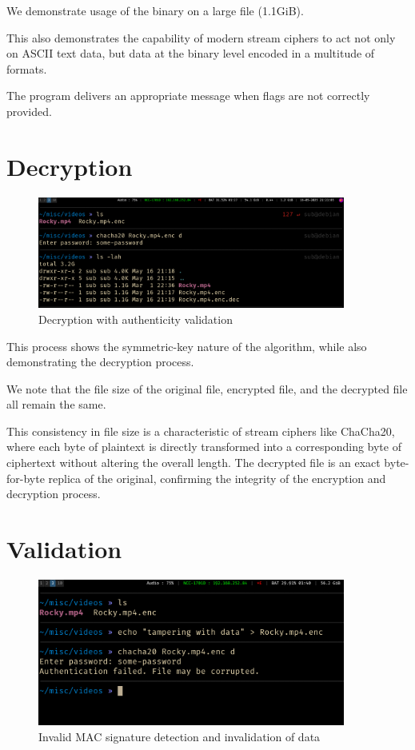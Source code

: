 \documentclass[a4paper,12pt]{report}
\begin{document}
We demonstrate usage of the binary on a large file (1.1GiB).

This also demonstrates the capability of modern stream ciphers to act not only on ASCII text data, but data at the binary level encoded in a multitude of formats.

The program delivers an appropriate message when flags are not correctly provided.

\section{Decryption}
\begin{figure}[h]
	\centering
	\includegraphics[width=0.9\textwidth]{../assets/3_decryption.png}
        \caption{Decryption with authenticity validation}
	\label{image}
\end{figure}

This process shows the symmetric-key nature of the algorithm, while also demonstrating the decryption process.

We note that the file size of the original file, encrypted file, and the decrypted file all remain the same.

This consistency in file size is a characteristic of stream ciphers like ChaCha20, where each byte of plaintext is directly transformed into a corresponding byte of ciphertext without altering the overall length.
The decrypted file is an exact byte-for-byte replica of the original, confirming the integrity of the encryption and decryption process.

\section{Validation}
\begin{figure}[H]
	\centering
	\includegraphics[width=0.9\textwidth]{../assets/4_Poly-1305.png}
        \caption{Invalid MAC signature detection and invalidation of data}
	\label{image}
\end{figure}
\end{document}
